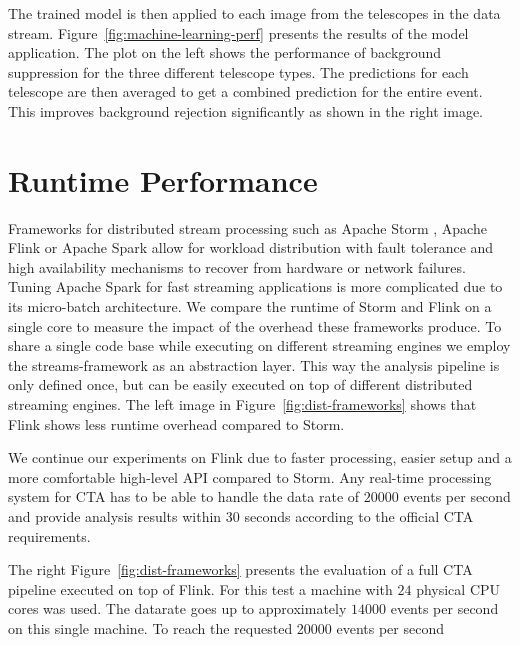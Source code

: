 \documentclass[11pt,twoside]{article}
\begin{document}
The trained model is then applied to each image from the telescopes in the data stream.
Figure~\ref{fig:machine-learning-perf} presents the results of the model application.
The plot on the left shows the performance of background suppression for the three different telescope types.
The predictions for each telescope are then averaged to get a combined prediction for the entire event.
This improves background rejection significantly as shown in the right image.



\section{Runtime Performance}


Frameworks for distributed stream processing such as Apache Storm \citep{storm}, Apache Flink \citep{flink} or Apache Spark \citep{spark}
allow for workload distribution with fault tolerance and high availability mechanisms to recover from hardware or network failures.
Tuning Apache Spark for fast streaming applications is more complicated due to its micro-batch architecture.
We compare the runtime of Storm and Flink on a single core to measure the impact of the overhead these frameworks produce.
To share a single code base while executing on different streaming engines we employ the streams-framework \citep{streams}
as an abstraction layer.
This way the analysis pipeline is only defined once, but can be easily executed on top of different distributed streaming engines.
The left image in Figure~\ref{fig:dist-frameworks} shows that Flink shows less runtime overhead compared to Storm.

We continue our experiments on Flink due to faster processing, easier setup and a more comfortable high-level API compared to Storm.
Any real-time processing system for CTA has to be able to handle the data rate of $20000$ events per second and provide analysis results
within 30 seconds according to the official CTA requirements.

The right Figure~\ref{fig:dist-frameworks} presents the evaluation of a full CTA pipeline executed on top of Flink.
For this test a machine with $24$ physical CPU cores was used.
The datarate goes up to approximately $14000$ events per second on this single machine.
To reach the requested 20000 events per second
\end{document}
